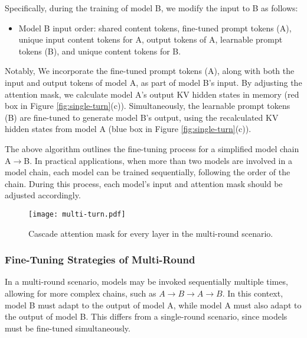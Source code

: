 Specifically, during the training of model B, we modify the input to B as follows:
\begin{itemize} 
\item Model B input order: shared content tokens, fine-tuned prompt tokens (A), unique input content tokens for A, output tokens of A, learnable prompt tokens (B), and unique content tokens for B. 
\end{itemize}

Notably, We incorporate the fine-tuned prompt tokens (A),  along with both the input and output tokens of model A, as part of model B's input. By adjusting the attention mask, we calculate model A's output KV hidden states in memory (red box in Figure \ref{fig:single-turn}(c)). Simultaneously, the learnable prompt tokens (B) are fine-tuned to generate model B’s output, using the recalculated KV hidden states from model A (blue box in Figure \ref{fig:single-turn}(c)).



The above algorithm outlines the fine-tuning process for a simplified model chain A$\rightarrow$B. In practical applications, when more than two models are involved in a model chain, each model can be trained sequentially, following the order of the chain. During this process, each model's input and attention mask should be adjusted accordingly.

\begin{figure}[t]
\centerline{\texttt{[image: multi-turn.pdf]}}
\caption{Cascade attention mask for every layer in the multi-round scenario.
}
\label{fig:multi-turn}
\end{figure}

\subsubsection{Fine-Tuning Strategies of Multi-Round}
In a multi-round scenario, models may be invoked sequentially multiple times, allowing for more complex chains, such as $A \rightarrow B \rightarrow A \rightarrow B$. In this context, model B must adapt to the output of model A, while model A must also adapt to the output of model B. This differs from a single-round scenario, since models must be fine-tuned simultaneously.

